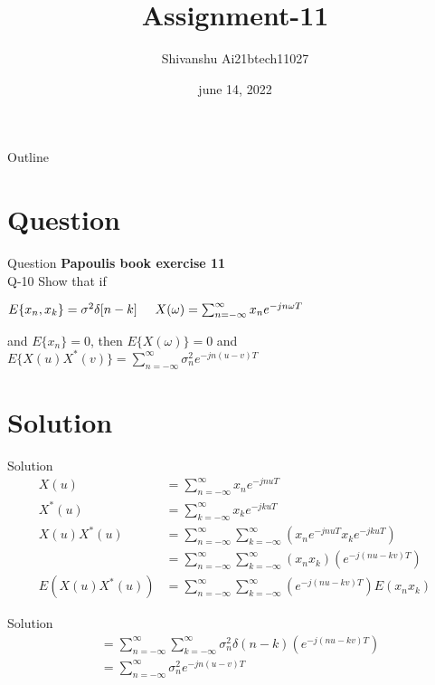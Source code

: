 \documentclass[15pt]{beamer}
\title{Assignment-11}
\author{Shivanshu  Ai21btech11027}
\date{june 14, 2022}
\begin{document}
\begin{frame}
    \titlepage 
\end{frame}

\begin{frame}{Outline}
    \tableofcontents
\end{frame}

    \section{Question}
    \begin{frame}{Question}
        \textbf{Papoulis book exercise 11}\\
        \large \noindent Q-10 Show that if\\
        \begin{center}
             $E\{x_n , x_k\} = \sigma^2\delta[n - k] \hspace{5mm} X(\omega) = \sum_{n=-\infty}^\infty x_ne^{-jn\omega T} $
        \end{center}
        and $E\{x_n\} = 0$, then $E\{X(\omega)\} = 0$ and \\
        $E\{X(u)X^*(v)\} = \sum_{n=-\infty}^\infty \sigma^2_n e^{-jn(u-v)T}$
    \end{frame}
    \section{Solution}
    \begin{frame}{Solution}
        \begin{align}
            X(u) &= \sum_{n=-\infty}^\infty x_n e^{-jnuT} \\
            X^*(u) &= \sum_{k=-\infty}^\infty x_k e^{-jkuT} \\
            X(u)X^*(u) &= \sum_{n=-\infty}^\infty \sum_{k=-\infty}^\infty ( x_n e^{-jnuT} x_k e^{-jkuT} ) \\
            &= \sum_{n=-\infty}^\infty \sum_{k=-\infty}^\infty (x_n x_k)(e^{-j(nu-kv)T}) \\
            E(X(u)X^*(u)) &=  \sum_{n=-\infty}^\infty \sum_{k=-\infty}^\infty (e^{-j(nu-kv)T}) E(x_n x_k)
        \end{align}
    \end{frame}
    \begin{frame}{Solution}
        \begin{align}
            &= \sum_{n=-\infty}^\infty \sum_{k=-\infty}^\infty \sigma_n^2\delta(n - k) (e^{-j(nu - kv)T}) \\
            &= \sum_{n=-\infty}^\infty \sigma_n^2 e^{-jn(u - v)T}
        \end{align}
    \end{frame}
\end{document}
